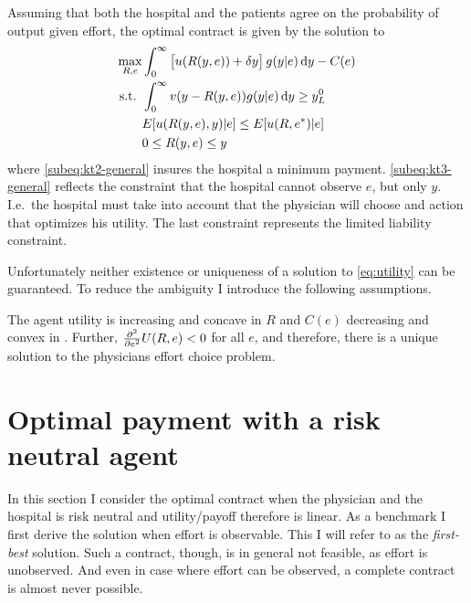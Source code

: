 	Assuming that both the hospital and the patients agree on the probability of output given effort, the optimal contract is given by the solution to
	\begin{subequations}
		\label{eq:ktgeneral}
		\begin{align}
			\max_{R,e}   & \int_0^{\infty}\left[u(R(y,e))+\delta y\right]g(y|e)\dif y-C(e)\label{subeq:kt1-general} \\
			\text{s.t. } & \int_{0}^{\infty} v(y-R(y,e))g(y|e)\dif y\geq y_L^0 \label{subeq:kt2-general}            \\
			             & E[u(R(y,e),y)|e]\leq E[u(R,e^*)|e] \label{subeq:kt3-general}                             \\
			             & 0\leq R(y,e)\leq y \label{subeq:kt4-general}                                             
		\end{align}
	\end{subequations}
	where \cref{subeq:kt2-general} insures the hospital a minimum payment. \cref{subeq:kt3-general} reflects the constraint that the hospital cannot observe $e$, but only $y$. I.e.\ the hospital must take into account that the physician will choose and action that optimizes his utility. The last constraint represents the limited liability constraint. 
				
	Unfortunately neither existence or uniqueness of a solution to \cref{eq:utility} can be guaranteed. To reduce the ambiguity I introduce the following assumptions. 
				
	\begin{assumption}
		\label{asump:unique-solution}
		The agent utility is increasing and concave in $R$ and $C(e)$ decreasing and convex in . Further, $\pder[][2]{e}U(R,e)<0$ for all $e$, and therefore, there is a unique solution to the physicians effort choice problem.
	\end{assumption}
				
				
	\section{Optimal payment with a risk neutral agent} %
	\label{sec:optimal_payment_with_a_risk_neutral_agent}
	In this section I consider the optimal contract when the physician and the hospital is risk neutral and utility/payoff therefore is linear. As a benchmark I first derive the solution when effort is observable. This I will refer to as the \emph{first-best} solution. Such a contract, though, is in general not feasible, as effort is unobserved. And even in case where effort can be observed, a complete contract is almost never possible. 
				
